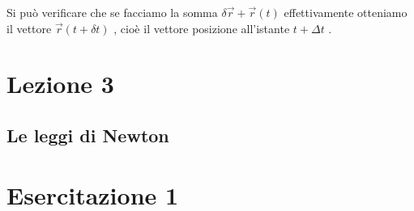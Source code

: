 \documentclass[a4paper]{book}
\begin{document}
Si può verificare che se facciamo la somma  $ \delta \overrightarrow{r} + \overrightarrow{r} ( t ) $ effettivamente otteniamo il vettore $ \overrightarrow{r} ( t + \delta t ) $ , cioè il vettore posizione all'istante $ t + \Delta t $ .




\chapter{Lezione 3}
\section{Le leggi di Newton}

\chapter{Esercitazione 1}
\end{document}
